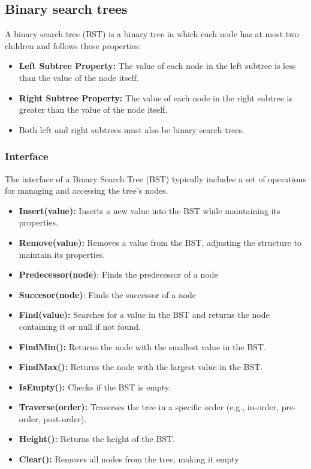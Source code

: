 \documentclass{report}
\begin{document}
\pagebreak 
{}
\bigbreak \noindent 
\subsection{Binary search trees}
\bigbreak \noindent 
A binary search tree (BST) is a binary tree in which each node has at most two children and follows these properties:
\begin{itemize}
    \item \textbf{Left Subtree Property:} The value of each node in the left subtree is less than the value of the node itself.
    \item \textbf{Right Subtree Property:} The value of each node in the right subtree is greater than the value of the node itself.
    \item Both left and right subtrees must also be binary search trees.
\end{itemize}
\bigbreak \noindent 
\subsubsection{Interface}
\bigbreak \noindent 
The interface of a Binary Search Tree (BST) typically includes a set of operations for managing and accessing the tree’s nodes.
\begin{itemize}
    \item \textbf{Insert(value):} Inserts a new value into the BST while maintaining its properties.
    \item \textbf{Remove(value):} Removes a value from the BST, adjusting the structure to maintain its properties.
    \item \textbf{Predecessor(node)}: Finds the predecessor of a node
    \item \textbf{Succesor(node)}: Finds the successor of a node
    \item \textbf{Find(value):} Searches for a value in the BST and returns the node containing it or null if not found.
    \item \textbf{FindMin():} Returns the node with the smallest value in the BST.
    \item \textbf{FindMax():} Returns the node with the largest value in the BST.
    \item \textbf{IsEmpty():} Checks if the BST is empty.
    \item \textbf{Traverse(order):} Traverses the tree in a specific order (e.g., in-order, pre-order, post-order).
    \item \textbf{Height():} Returns the height of the BST.
    \item \textbf{Clear():} Removes all nodes from the tree, making it empty
\end{itemize}
\end{document}
